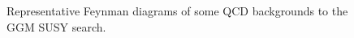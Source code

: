 \documentclass[dissertation_bw.tex]{subfiles}
\begin{document}
\begin{figure}
	\hspace{1cm}
	\caption{Representative Feynman diagrams of some QCD backgrounds to the GGM SUSY search.}
	\label{fig:QCD_background_diagrams}
\end{figure}
\end{document}
